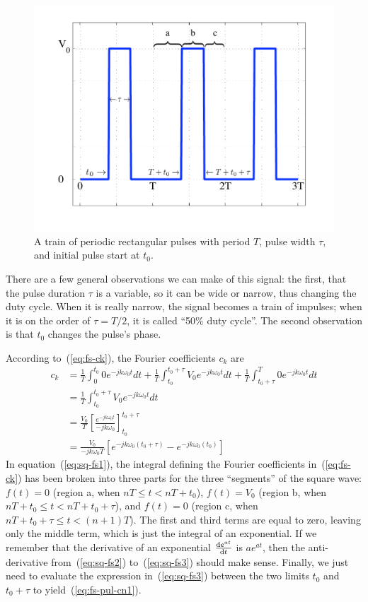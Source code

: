 \begin{figure}
\centerline{\includegraphics[width=5in]{ch-physical/fs_pulse}}
\caption[A train of periodic rectangular pulses]{A train of periodic
rectangular pulses with period $T$, pulse width $\tau$, and
initial pulse start at $t_0$.
\label{fig:fs-pulse}}
\end{figure}

There are a few general observations we can make of this signal: the
first, that the pulse duration $\tau$ is a variable, so it can be wide
or narrow, thus changing the duty cycle. When it is really narrow, the
signal becomes a train of impulses; when it is on the order of
$\tau=T/2$, it is called ``50\% duty cycle''. The second observation
is that $t_0$ changes the pulse's phase.

According to~(\ref{eq:fs-ck}), the Fourier coefficients $c_k$ are
\begin{align}
c_k &= \frac{1}{T}\int_0^{t_0} 0e^{-jk\omega_0 t} dt
      +\frac{1}{T}\int_{t_0}^{t_0+\tau}V_0e^{-jk\omega_0 t}dt 
      +\frac{1}{T}\int_{t_0+\tau}^{T}0e^{-jk\omega_0 t}dt 
      \label{eq:sq-fs1}\\
    &=\frac{1}{T}\int_{t_0}^{t_0+\tau}V_0e^{-jk\omega_0 t}dt 
      \label{eq:sq-fs2}\\
    &=\frac{V_0}{T}\left[\frac{e^{-jk\omega_0t}}
                               {-jk\omega_0}\right]_{t_0}^{t_0+\tau}
       \label{eq:sq-fs3}\\
    &=\frac{V_0}{-jk\omega_0T}[e^{-jk\omega_0(t_0+\tau)}
                               -e^{-jk\omega_0(t_0)}]
\label{eq:fs-pul-cn1}
\end{align}
In equation~(\ref{eq:sq-fs1}), the integral defining the Fourier
coefficients in~(\ref{eq:fs-ck}) has been broken into three parts for
the three ``segments'' of the square wave: $f(t)=0$ (region a, when $nT\leq t <
nT+t_0$), $f(t)=V_0$ (region b, when $nT+t_0 \leq t < nT+t_0+\tau$), and
$f(t)=0$ (region c, when $nT+t_0+\tau \leq t < (n+1)T$). The first and third
terms are equal to zero, leaving only the middle term, which is just
the integral of an exponential. If we remember that the derivative of
an exponential $\frac{\mathrm{d} e^{at}}{\mathrm{d} t}$ is $ae^{at}$, then the
anti-derivative from~(\ref{eq:sq-fs2}) to~(\ref{eq:sq-fs3}) should
make sense. Finally, we just need to evaluate the expression
in~(\ref{eq:sq-fs3}) between the two limits $t_0$ and $t_0+\tau$ to
yield~(\ref{eq:fs-pul-cn1}).

